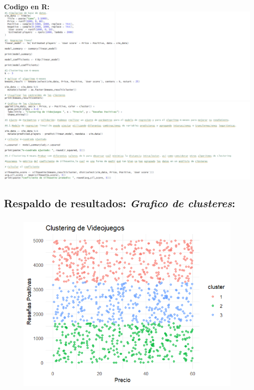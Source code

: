 \documentclass[
  letterpaper,
  DIV=11,
  numbers=noendperiod]{scrreprt}
\begin{document}
\textbf{Codigo en R:} \includegraphics{./imagenes/CodigoR1.png}
\includegraphics{./imagenes/CodigoR2.png}

\hypertarget{respaldo-de-resultados-grafico-de-clusteres}{%
\subsection{\texorpdfstring{Respaldo de resultados: \emph{Grafico de
clusteres}:}{Respaldo de resultados: Grafico de clusteres:}}\label{respaldo-de-resultados-grafico-de-clusteres}}

\begin{figure}

{\centering \includegraphics[width=138mm,height=92mm]{./imagenes/GrafRespaldoJ.png}

}

\end{figure}
\end{document}
